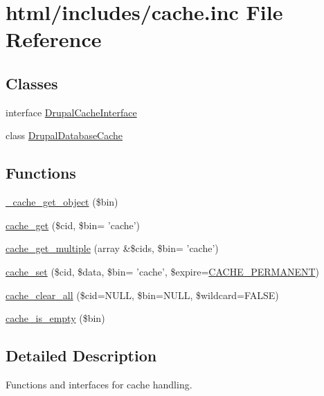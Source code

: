 \hypertarget{includes_2cache_8inc}{
\section{html/includes/cache.inc File Reference}
\label{includes_2cache_8inc}
}
\subsection*{Classes}
\begin{DoxyCompactItemize}
\item 
interface \hyperlink{interfaceDrupalCacheInterface}{DrupalCacheInterface}
\item 
class \hyperlink{classDrupalDatabaseCache}{DrupalDatabaseCache}
\end{DoxyCompactItemize}
\subsection*{Functions}
\begin{DoxyCompactItemize}
\item 
\hyperlink{includes_2cache_8inc_aebc44cd35cb38b264cf0b07a164ee1af}{\_\-cache\_\-get\_\-object} (\$bin)
\item 
\hyperlink{includes_2cache_8inc_a9d873815c28909b61c3a6188b383f8a3}{cache\_\-get} (\$cid, \$bin= 'cache')
\item 
\hyperlink{includes_2cache_8inc_a2c67628faec5b49aa0fdc987422540d4}{cache\_\-get\_\-multiple} (array \&\$cids, \$bin= 'cache')
\item 
\hyperlink{includes_2cache_8inc_a48081f36334909f561ef4f538fa640d2}{cache\_\-set} (\$cid, \$data, \$bin= 'cache', \$expire=\hyperlink{bootstrap_8inc_ad987330fff5fa7c75800762ddedf300c}{CACHE\_\-PERMANENT})
\item 
\hyperlink{includes_2cache_8inc_a409b34dd629640d791a11736a9de8125}{cache\_\-clear\_\-all} (\$cid=NULL, \$bin=NULL, \$wildcard=FALSE)
\item 
\hyperlink{includes_2cache_8inc_a859ec549c0cf60273cb094fa42a14604}{cache\_\-is\_\-empty} (\$bin)
\end{DoxyCompactItemize}


\subsection{Detailed Description}
Functions and interfaces for cache handling. 

